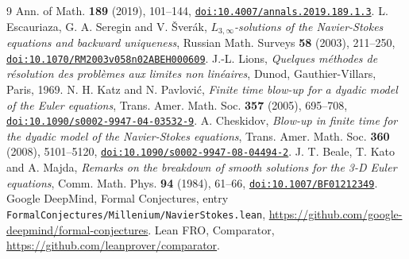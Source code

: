 \documentclass[11pt]{article}
\theoremstyle{remark}
\newcommand{\fp}[1]{\nolinkurl{#1}}
\begin{document}
\begin{thebibliography}{9}
Ann. of Math. \textbf{189} (2019), 101--144,
\href{https://doi.org/10.4007/annals.2019.189.1.3}{\fp{doi:10.4007/annals.2019.189.1.3}}.
 L. Escauriaza, G. A. Seregin and V. \v{S}ver\'ak, \emph{$L_{3,\infty}$-solutions of the Navier-Stokes
equations and backward uniqueness}, Russian Math. Surveys \textbf{58} (2003), 211--250,
\href{https://doi.org/10.1070/RM2003v058n02ABEH000609}{\fp{doi:10.1070/RM2003v058n02ABEH000609}}.
 J.-L. Lions, \emph{Quelques m\'ethodes de r\'esolution des probl\`emes aux limites non
lin\'eaires}, Dunod, Gauthier-Villars, Paris, 1969.
 N. H. Katz and N. Pavlovi\'c, \emph{Finite time blow-up for a dyadic model of the Euler equations},
Trans. Amer. Math. Soc. \textbf{357} (2005), 695--708,
\href{https://doi.org/10.1090/s0002-9947-04-03532-9}{\fp{doi:10.1090/s0002-9947-04-03532-9}}.
 A. Cheskidov, \emph{Blow-up in finite time for the dyadic model of the Navier-Stokes equations},
Trans. Amer. Math. Soc. \textbf{360} (2008), 5101--5120,
\href{https://doi.org/10.1090/s0002-9947-08-04494-2}{\fp{doi:10.1090/s0002-9947-08-04494-2}}.
 J. T. Beale, T. Kato and A. Majda, \emph{Remarks on the breakdown of smooth solutions for the 3-D
Euler equations}, Comm. Math. Phys. \textbf{94} (1984), 61--66,
\href{https://doi.org/10.1007/BF01212349}{\fp{doi:10.1007/BF01212349}}.
 Google DeepMind, Formal Conjectures, entry \fp{FormalConjectures/Millenium/NavierStokes.lean},
\url{https://github.com/google-deepmind/formal-conjectures}.
 Lean FRO, Comparator, \url{https://github.com/leanprover/comparator}.
\end{thebibliography}
\end{document}
